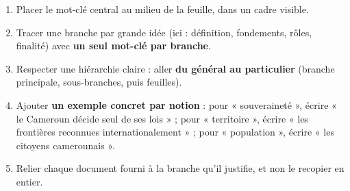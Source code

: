 \documentclass[11pt]{article}
\newcommand{\cle}[1]{{\popxbold\color{popdark}#1}}
\begin{document}
\begin{methode}
\begin{enumerate}
\item Placer le \cle{mot-clé} central au milieu de la feuille, dans un cadre visible.
\item Tracer une branche par grande idée (ici : définition, fondements, rôles, finalité) avec \textbf{un seul mot-clé par branche}.
\item Respecter une hiérarchie claire : aller \textbf{du général au particulier} (branche principale, sous-branches, puis feuilles).
\item Ajouter \textbf{un exemple concret par notion} : pour « souveraineté », écrire « le Cameroun décide seul de ses lois » ; pour « territoire », écrire « les frontières reconnues internationalement » ; pour « population », écrire « les citoyens camerounais ».
\item Relier chaque document fourni à la branche qu'il justifie, et non le recopier en entier.
\end{enumerate}
\end{methode}
\end{document}
